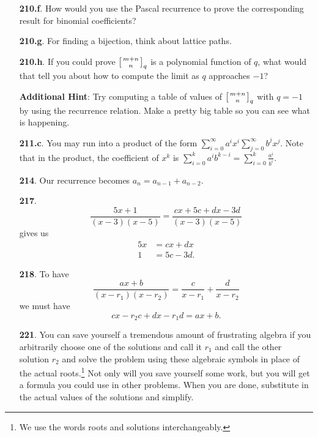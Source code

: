 \documentclass[10pt,]{book}
\theoremstyle{plain}
\theoremstyle{definition}
\theoremstyle{definition}
\numberwithin{equation}{chapter}
\newcommand{\qchoose}[2]{\left[{#1\atop#2}\right]_q}
\newcommand{\amp}{&}
\begin{document}
\begin{itemize}[itemsep=1em]
\item[\textbf{210.f}.]How would you use the Pascal recurrence to prove the corresponding result for binomial coefficients?%

\item[\textbf{210.g}.]For finding a bijection, think about lattice paths.%

\item[\textbf{210.h}.]If you could prove \(\qchoose{m+n}{n}\) is a polynomial function of \(q\), what would that tell you about how to compute the limit as \(q\) approaches \(-1\)?%

\par\smallskip
\noindent\textbf{Additional Hint}: Try computing a table of values of \(\qchoose{m+n}{n}\) with \(q=-1\) by using the recurrence relation. Make a pretty big table so you can see what is happening.%

\item[\textbf{211.c}.]You may run into a product of the form \(\sum_{i=0}^\infty a^ix^i\sum_{j=0}^\infty b^jx^j\). Note that in the product, the coefficient of \(x^k\) is \(\sum_{i=0}^k a^ib^{k-i} = \sum_{i=0}^k \frac{a^i}{b^i}\).%

\item[\textbf{214}.]Our recurrence becomes \(a_n = a_{n-1} + a_{n-2}\).%

\item[\textbf{217}.]%
\begin{equation*}
\frac{5x+1}{(x-3)(x-5)} = \frac{cx+5c+dx-3d}{(x-3)(x-5)}
\end{equation*}
gives us%
\begin{align*}
5x \amp = cx+dx\\
1 \amp= 5c-3d\text{.}
\end{align*}
%

\item[\textbf{218}.]To have%
\begin{equation*}
\frac{ax+b}{(x-r_1)(x-r_2)} = \frac{c}{x-r_1} + \frac{d}{x-r_2}
\end{equation*}
we must have%
\begin{equation*}
cx-r_2c+dx-r_1d =ax+b\text{.}
\end{equation*}
%

\item[\textbf{221}.]You can save yourself a tremendous amount of frustrating algebra if you arbitrarily choose one of the solutions and call it \(r_1\) and call the other solution \(r_2\) and solve the problem using these algebraic symbols in place of the actual roots.\footnote{We use the words roots and solutions interchangeably.\label{fn-15}} Not only will you save yourself some work, but you will get a formula you could use in other problems. When you are done, substitute in the actual values of the solutions and simplify.%


\end{itemize}
\end{document}
